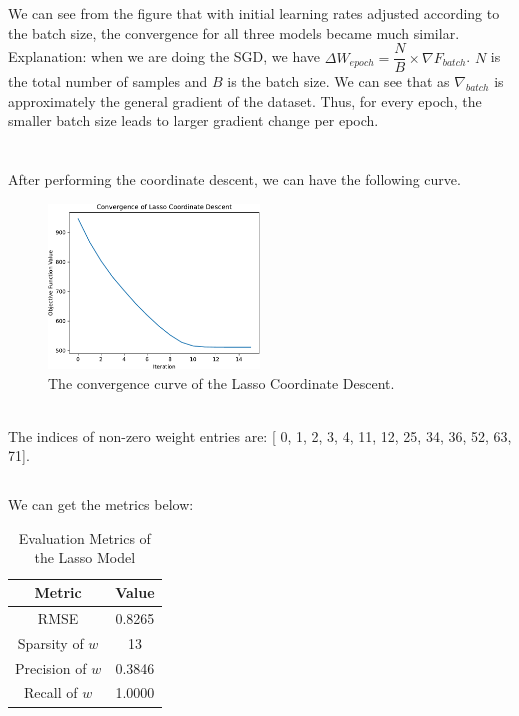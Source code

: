 \documentclass{article}
\begin{document}
We can see from the figure that with initial learning rates adjusted according to the batch size, the convergence for all three models became much similar. \\ 
Explanation: when we are doing the SGD, we have $ \Delta W_{epoch} = \dfrac{N}{B} \times \nabla F_{batch}  $. $ N $ is the total number of samples and $ B $ is the batch size. We can see that as $ \nabla_{batch} $ is approximately the general gradient of the dataset. Thus, for every epoch, the smaller batch size leads to larger gradient change per epoch. \\
\clearpage
\section{}
\subsection{}
After performing the coordinate descent, we can have the following curve.
\begin{figure}[htbp]
    \begin{center}
        \includegraphics[width=0.5\textwidth]{./figures/lasso_convergence.pdf}
    \end{center}
    \caption{The convergence curve of the Lasso Coordinate Descent.}\label{fig:}
\end{figure}\\ 
The indices of non-zero weight entries are: [ 0,  1,  2,  3,  4, 11, 12, 25, 34, 36, 52, 63, 71].
\subsection{}
We can get the metrics below:\\ 
\begin{table}[ht]
\centering
\begin{tabular}{|c|c|}
\hline
\textbf{Metric}         & \textbf{Value} \\ \hline
RMSE                    & 0.8265       \\ \hline
Sparsity of $w$         & 13           \\ \hline
Precision of $w$        & 0.3846       \\ \hline
Recall of $w$           & 1.0000       \\ \hline
\end{tabular}
\caption{Evaluation Metrics of the Lasso Model}
\label{tab:lasso_eval}
\end{table}
\clearpage
\end{document}
